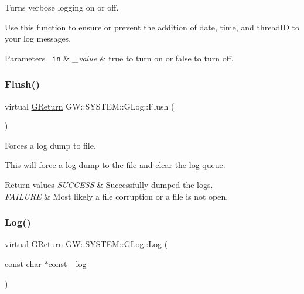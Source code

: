 Turns verbose logging on or off. 

Use this function to ensure or prevent the addition of date, time, and thread\+ID to your log messages.


\begin{DoxyParams}[1]{Parameters}
\mbox{\texttt{ in}}  & {\em \+\_\+value} & true to turn on or false to turn off. \\
\hline
\end{DoxyParams}
\mbox{\label{classGW_1_1SYSTEM_1_1GLog_a07147c15ecb17caa1c83974b3c54f7d4}} 
\subsubsection{\texorpdfstring{Flush()}{Flush()}}
{\footnotesize\ttfamily virtual \mbox{\hyperlink{namespaceGW_a67a839e3df7ea8a5c5686613a7a3de21}{G\+Return}} G\+W\+::\+S\+Y\+S\+T\+E\+M\+::\+G\+Log\+::\+Flush (\begin{DoxyParamCaption}{ }\end{DoxyParamCaption})\hspace{0.3cm}{\ttfamily [pure virtual]}}



Forces a log dump to file. 

This will force a log dump to the file and clear the log queue.


\begin{DoxyRetVals}{Return values}
{\em S\+U\+C\+C\+E\+SS} & Successfully dumped the logs. \\
\hline
{\em F\+A\+I\+L\+U\+RE} & Most likely a file corruption or a file is not open. \\
\hline
\end{DoxyRetVals}
\mbox{\label{classGW_1_1SYSTEM_1_1GLog_a9e21e702d012065fe799b4c49f7ac670}} 
\subsubsection{\texorpdfstring{Log()}{Log()}}
{\footnotesize\ttfamily virtual \mbox{\hyperlink{namespaceGW_a67a839e3df7ea8a5c5686613a7a3de21}{G\+Return}} G\+W\+::\+S\+Y\+S\+T\+E\+M\+::\+G\+Log\+::\+Log (\begin{DoxyParamCaption}\item[{const char $\ast$const}]{\+\_\+log }\end{DoxyParamCaption})\hspace{0.3cm}{\ttfamily [pure virtual]}}



